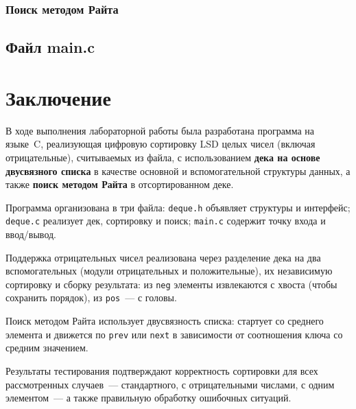 \documentclass[a4paper,14pt]{extarticle}
\begin{document}


\subsubsection*{Поиск методом Райта}



\subsection{Файл main.c}



\newpage
\section*{Заключение}

В ходе выполнения лабораторной работы была разработана программа на языке~C, реализующая цифровую сортировку LSD целых чисел (включая отрицательные), считываемых из файла, с использованием \textbf{дека на основе двусвязного списка} в качестве основной и вспомогательной структуры данных, а также \textbf{поиск методом Райта} в отсортированном деке.

Программа организована в три файла: \texttt{deque.h} объявляет структуры и интерфейс; \texttt{deque.c} реализует дек, сортировку и поиск; \texttt{main.c} содержит точку входа и ввод/вывод.

Поддержка отрицательных чисел реализована через разделение дека на два вспомогательных (модули отрицательных и положительные), их независимую сортировку и сборку результата: из \texttt{neg} элементы извлекаются с хвоста (чтобы сохранить порядок), из \texttt{pos}~--- с головы.

Поиск методом Райта использует двусвязность списка: стартует со среднего элемента и движется по \texttt{prev} или \texttt{next} в зависимости от соотношения ключа со средним значением.

Результаты тестирования подтверждают корректность сортировки для всех рассмотренных случаев~--- стандартного, с отрицательными числами, с одним элементом~--- а также правильную обработку ошибочных ситуаций.

\clearpage
{}
\label{sec:appendix}
\end{document}
